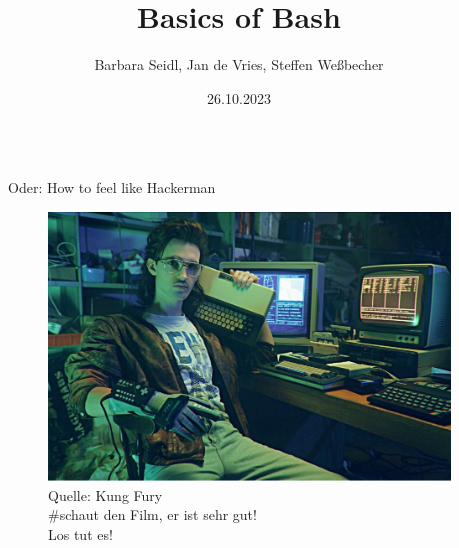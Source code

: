 \documentclass[t, xcolor=dvipsnames]{beamer}
\title{Basics of Bash}
\date[26.10.2023]{26.10.2023}
\author[Seidl, de Vries]{Barbara Seidl, Jan de Vries, Steffen Weßbecher}
\begin{document}
\begin{frame}
\titlepage

\begin{columns}
	\begin{column}{0.5\textwidth}
	
	\end{column}
	\begin{column}{0.5\textwidth}
	Oder: How to feel like Hackerman
	\begin{figure}
    	\centering
    	\includegraphics[width=1\textwidth]{graphics/hackerman}
        	\tiny{Quelle: Kung Fury\\ \#schaut den Film, er ist sehr gut!\\ Los tut es!}
    	\end{figure}
    	
	\end{column}
\end{columns}

\end{frame}
\end{document}
